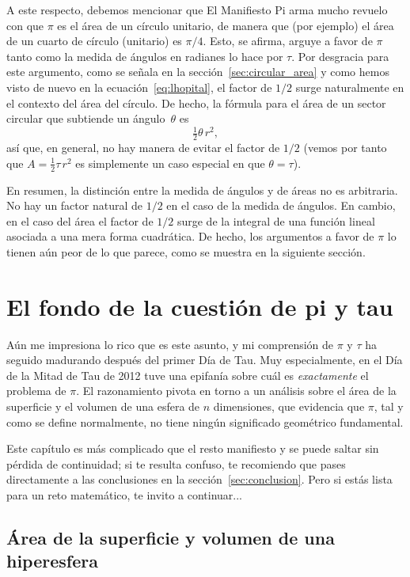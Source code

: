 A este respecto, debemos mencionar que El Manifiesto Pi arma mucho revuelo con que $\pi$ es el área de un círculo unitario, de manera que (por ejemplo) el área de un cuarto de círculo (unitario) es $\pi/4$. Esto, se afirma, arguye a favor de $\pi$ tanto como la medida de ángulos en radianes lo hace por $\tau$. Por desgracia para este argumento, como se señala en la sección~\ref{sec:circular_area} y como hemos visto de nuevo en la ecuación~\eqref{eq:lhopital}, el factor de $1/2$ surge naturalmente en el contexto del área del círculo. De hecho, la fórmula para el área de un sector circular que subtiende un ángulo~$\theta$ es
\[
\tfrac{1}{2}\theta\, r^2,
\]
así que, en general, no hay manera de evitar el factor de $1/2$ (vemos por tanto que $A = \frac{1}{2} \tau\, r^2$ es simplemente un caso especial en que  $\theta = \tau$).

En resumen, la distinción entre la medida de ángulos y de áreas no es arbitraria. No hay un factor natural de $1/2$ en el caso de la medida de ángulos. En cambio, en el caso del área el factor de $1/2$ surge de la integral de una función lineal asociada a una mera forma cuadrática. De hecho, los argumentos a favor de $\pi$ lo tienen aún peor de lo que parece, como se muestra en la siguiente sección.


\section{El fondo de la cuestión de pi y tau} %
\label{sec:getting_to_the_bottom_of_pi}

Aún me impresiona lo rico que es este asunto, y mi comprensión de $\pi$ y $\tau$ ha seguido madurando después del primer Día de Tau. Muy especialmente, en el Día de la Mitad de Tau de 2012 tuve una epifanía sobre cuál es \emph{exactamente} el problema de $\pi$. El razonamiento pivota en torno a un análisis sobre el área de la superficie y el volumen de una esfera de $n$ dimensiones, que evidencia que $\pi$, tal y como se define normalmente, no tiene ningún significado geométrico fundamental. 

Este capítulo es más complicado que el resto manifiesto y se puede saltar sin pérdida de continuidad; si te resulta confuso, te recomiendo que pases directamente a las conclusiones en la sección~\ref{sec:conclusion}. Pero si estás lista para un reto matemático, te invito a continuar...

  \subsection{Área de la superficie y volumen de una hiperesfera} %
  \label{sec:volume_of_a_hypersphere}

